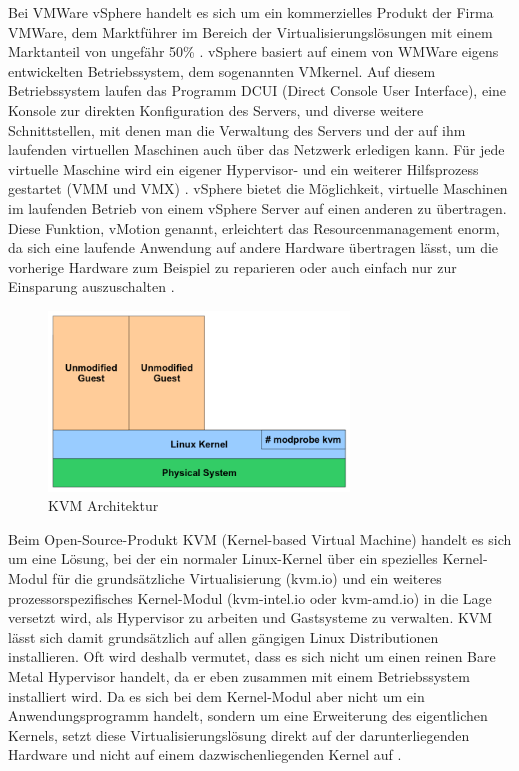Bei VMWare vSphere handelt es sich um ein kommerzielles Produkt der Firma VMWare, dem Marktführer im Bereich der Virtualisierungslösungen mit einem Marktanteil von ungefähr 50\% \citep[Vgl.][]{vmware:001}. vSphere basiert auf einem von WMWare eigens entwickelten Betriebssystem, dem sogenannten VMkernel. Auf diesem Betriebssystem laufen das Programm DCUI (Direct Console User Interface), eine Konsole zur direkten Konfiguration des Servers, und diverse weitere Schnittstellen, mit denen man die Verwaltung des Servers und der auf ihm laufenden virtuellen Maschinen auch über das Netzwerk erledigen kann. Für jede virtuelle Maschine wird ein eigener Hypervisor- und ein weiterer Hilfsprozess gestartet (VMM und VMX) \citep[Vgl.][S. 3]{vmware:002}. vSphere bietet die Möglichkeit, virtuelle Maschinen im laufenden Betrieb von einem vSphere Server auf einen anderen zu übertragen. Diese Funktion, vMotion genannt, erleichtert das Resourcenmanagement enorm, da sich eine laufende Anwendung auf andere Hardware übertragen lässt, um die vorherige Hardware zum Beispiel zu reparieren oder auch einfach nur zur Einsparung auszuschalten \citep[Vgl.][S. 4]{wmware:003}.

\begin{figure}[!ht]
  \begin{center}
    \includegraphics[width=8cm]{bilder/kvm.png}
    \caption{KVM Architektur \citep{kvm:002}}
  \end{center}
\end{figure}

Beim Open-Source-Produkt KVM (Kernel-based Virtual Machine) handelt es sich um eine Lösung, bei der ein normaler Linux-Kernel über ein spezielles Kernel-Modul für die grundsätzliche Virtualisierung (kvm.io) und ein weiteres prozessorspezifisches Kernel-Modul (kvm-intel.io oder kvm-amd.io) in die Lage versetzt wird, als Hypervisor zu arbeiten und Gastsysteme zu verwalten. KVM lässt sich damit grundsätzlich auf allen gängigen Linux Distributionen installieren. Oft wird deshalb vermutet, dass es sich nicht um einen reinen Bare Metal Hypervisor handelt, da er eben zusammen mit einem Betriebssystem installiert wird. Da es sich bei dem Kernel-Modul aber nicht um ein Anwendungsprogramm handelt, sondern um eine Erweiterung des eigentlichen Kernels, setzt diese Virtualisierungslösung direkt auf der darunterliegenden Hardware und nicht auf einem dazwischenliegenden Kernel auf \citep[Vgl.][S. 225 - 227]{KivKam07}.

